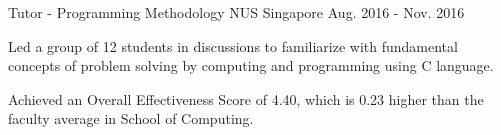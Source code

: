 \begin{cventries}

  \cventry
    {Tutor - Programming Methodology} %
    {NUS} %
    {Singapore} %
    {Aug. 2016 - Nov. 2016} %
    {
      \begin{cvitems} %
        \item {Led a group of 12 students in discussions to familiarize with fundamental concepts of problem solving by computing and programming using C language.}
        \item {Achieved an Overall Effectiveness Score of 4.40, which is 0.23 higher than the faculty average in School of Computing.}
      \end{cvitems}
    }

\end{cventries}
